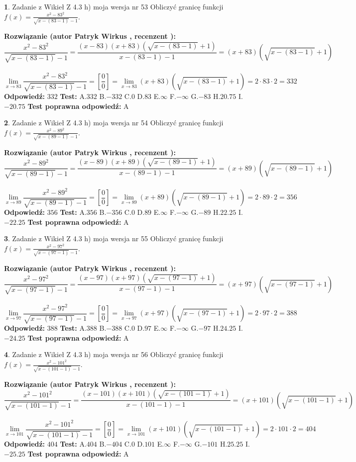 \documentclass[12pt, a4paper]{article}
\theoremstyle{definition} %
\newtheorem{zad}{}
\newcommand{\zadStart}[1]{\begin{zad}#1\newline}
\newcommand{\zadStop}{\end{zad}}
\newcommand{\rozwStart}[2]{\noindent \textbf{Rozwiązanie (autor #1 , recenzent #2): }\newline}
\newcommand{\rozwStop}{\newline}
\newcommand{\odpStart}{\noindent \textbf{Odpowiedź:}\newline}
\newcommand{\odpStop}{\newline}
\newcommand{\testStart}{\noindent \textbf{Test:}\newline}
\newcommand{\testStop}{\newline}
\newcommand{\kluczStart}{\noindent \textbf{Test poprawna odpowiedź:}\newline}
\newcommand{\kluczStop}{\newline}
\begin{document}
\zadStart{Zadanie z Wikieł Z 4.3 h) moja wersja nr 53}
Obliczyć granicę funkcji $f(x)=\frac{x^{2} - 83^{2}}{\sqrt{x-(83-1)}-1}$.
\zadStop
\rozwStart{Patryk Wirkus}{}
$$\frac{x^{2} - 83^{2}}{\sqrt{x-(83-1)}-1}=\frac{(x-83)(x+83)(\sqrt{x-(83-1)}+1)}{x-(83-1)-1}=(x+83)(\sqrt{x-(83-1)}+1)$$
\\
$$\lim\limits_{x\to 83}\frac{x^{2} - 83^{2}}{\sqrt{x-(83-1)}-1}=[\frac{0}{0}]=
\lim\limits_{x\to 83}(x+83)(\sqrt{x-(83-1)}+1) = 2\cdot83 \cdot 2 = 332$$
\rozwStop
\odpStart
$332$
\odpStop
\testStart
A.$332$
B.$-332$
C.$0$
D.$83$
E.$\infty$
F.$-\infty$
G.$-83$
H.$20.75$
I.$-20.75$
\testStop
\kluczStart
A
\kluczStop



\zadStart{Zadanie z Wikieł Z 4.3 h) moja wersja nr 54}
Obliczyć granicę funkcji $f(x)=\frac{x^{2} - 89^{2}}{\sqrt{x-(89-1)}-1}$.
\zadStop
\rozwStart{Patryk Wirkus}{}
$$\frac{x^{2} - 89^{2}}{\sqrt{x-(89-1)}-1}=\frac{(x-89)(x+89)(\sqrt{x-(89-1)}+1)}{x-(89-1)-1}=(x+89)(\sqrt{x-(89-1)}+1)$$
\\
$$\lim\limits_{x\to 89}\frac{x^{2} - 89^{2}}{\sqrt{x-(89-1)}-1}=[\frac{0}{0}]=
\lim\limits_{x\to 89}(x+89)(\sqrt{x-(89-1)}+1) = 2\cdot89 \cdot 2 = 356$$
\rozwStop
\odpStart
$356$
\odpStop
\testStart
A.$356$
B.$-356$
C.$0$
D.$89$
E.$\infty$
F.$-\infty$
G.$-89$
H.$22.25$
I.$-22.25$
\testStop
\kluczStart
A
\kluczStop



\zadStart{Zadanie z Wikieł Z 4.3 h) moja wersja nr 55}
Obliczyć granicę funkcji $f(x)=\frac{x^{2} - 97^{2}}{\sqrt{x-(97-1)}-1}$.
\zadStop
\rozwStart{Patryk Wirkus}{}
$$\frac{x^{2} - 97^{2}}{\sqrt{x-(97-1)}-1}=\frac{(x-97)(x+97)(\sqrt{x-(97-1)}+1)}{x-(97-1)-1}=(x+97)(\sqrt{x-(97-1)}+1)$$
\\
$$\lim\limits_{x\to 97}\frac{x^{2} - 97^{2}}{\sqrt{x-(97-1)}-1}=[\frac{0}{0}]=
\lim\limits_{x\to 97}(x+97)(\sqrt{x-(97-1)}+1) = 2\cdot97 \cdot 2 = 388$$
\rozwStop
\odpStart
$388$
\odpStop
\testStart
A.$388$
B.$-388$
C.$0$
D.$97$
E.$\infty$
F.$-\infty$
G.$-97$
H.$24.25$
I.$-24.25$
\testStop
\kluczStart
A
\kluczStop



\zadStart{Zadanie z Wikieł Z 4.3 h) moja wersja nr 56}
Obliczyć granicę funkcji $f(x)=\frac{x^{2} - 101^{2}}{\sqrt{x-(101-1)}-1}$.
\zadStop
\rozwStart{Patryk Wirkus}{}
$$\frac{x^{2} - 101^{2}}{\sqrt{x-(101-1)}-1}=\frac{(x-101)(x+101)(\sqrt{x-(101-1)}+1)}{x-(101-1)-1}=(x+101)(\sqrt{x-(101-1)}+1)$$
\\
$$\lim\limits_{x\to 101}\frac{x^{2} - 101^{2}}{\sqrt{x-(101-1)}-1}=[\frac{0}{0}]=
\lim\limits_{x\to 101}(x+101)(\sqrt{x-(101-1)}+1) = 2\cdot101 \cdot 2 = 404$$
\rozwStop
\odpStart
$404$
\odpStop
\testStart
A.$404$
B.$-404$
C.$0$
D.$101$
E.$\infty$
F.$-\infty$
G.$-101$
H.$25.25$
I.$-25.25$
\testStop
\kluczStart
A
\kluczStop
\end{document}
